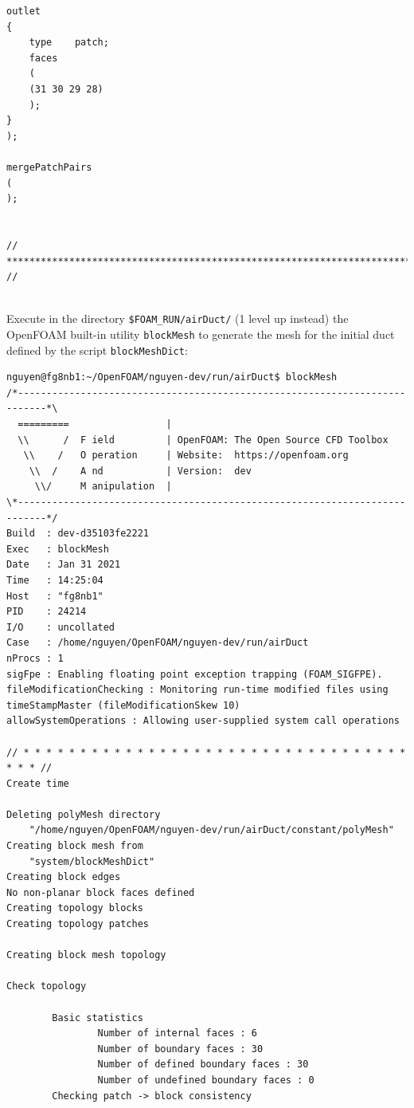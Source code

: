 \documentclass[onsided]{book}
\numberwithin{equation}{section}
\begin{document}
\begin{enumerate}
\begin{verbatim}
outlet
{
    type    patch;
    faces
    (
    (31 30 29 28)
    );
}
);

mergePatchPairs
(
);


// ************************************************************************* //
        
    \end{verbatim}
    Execute in the directory \verb|$FOAM_RUN/airDuct/| (1 level up instead) the OpenFOAM built-in utility \texttt{blockMesh} to generate the mesh for the initial duct defined by the script \texttt{blockMeshDict}:
    \begin{verbatim}
nguyen@fg8nb1:~/OpenFOAM/nguyen-dev/run/airDuct$ blockMesh 
/*---------------------------------------------------------------------------*\
  =========                 |
  \\      /  F ield         | OpenFOAM: The Open Source CFD Toolbox
   \\    /   O peration     | Website:  https://openfoam.org
    \\  /    A nd           | Version:  dev
     \\/     M anipulation  |
\*---------------------------------------------------------------------------*/
Build  : dev-d35103fe2221
Exec   : blockMesh
Date   : Jan 31 2021
Time   : 14:25:04
Host   : "fg8nb1"
PID    : 24214
I/O    : uncollated
Case   : /home/nguyen/OpenFOAM/nguyen-dev/run/airDuct
nProcs : 1
sigFpe : Enabling floating point exception trapping (FOAM_SIGFPE).
fileModificationChecking : Monitoring run-time modified files using timeStampMaster (fileModificationSkew 10)
allowSystemOperations : Allowing user-supplied system call operations

// * * * * * * * * * * * * * * * * * * * * * * * * * * * * * * * * * * * * * //
Create time

Deleting polyMesh directory
    "/home/nguyen/OpenFOAM/nguyen-dev/run/airDuct/constant/polyMesh"
Creating block mesh from
    "system/blockMeshDict"
Creating block edges
No non-planar block faces defined
Creating topology blocks
Creating topology patches

Creating block mesh topology

Check topology

        Basic statistics
                Number of internal faces : 6
                Number of boundary faces : 30
                Number of defined boundary faces : 30
                Number of undefined boundary faces : 0
        Checking patch -> block consistency


\end{verbatim}
\end{enumerate}
\end{document}
